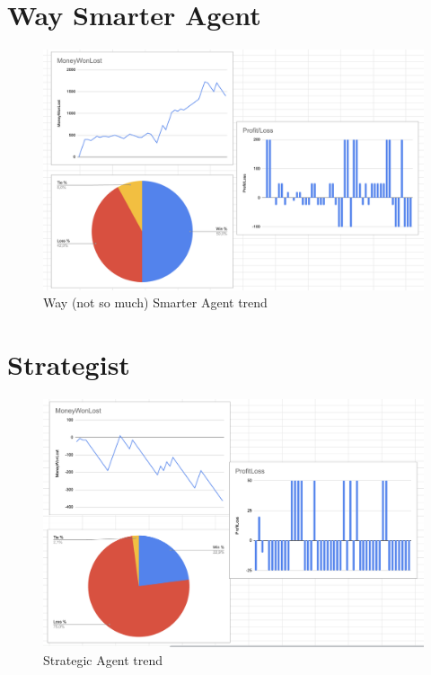 \section{Way Smarter Agent}
\begin{figure}[!htb]
    \centering
    \includegraphics[scale=0.35]{report/img/waySmart-statistic.png}
    \caption{Way (not so much) Smarter Agent trend}
    \label{fig:classDiagram}
\end{figure}

\section{Strategist}
\begin{figure}[!htb]
    \centering
    \includegraphics[scale=0.35]{report/img/strategist-statistic.png}
    \caption{Strategic Agent trend}
    \label{fig:classDiagram}
\end{figure}



